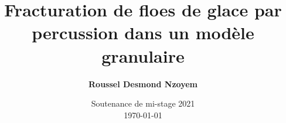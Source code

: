 \documentclass[notes,handout,compress]{beamer}
\begin{document}

\title[\textsc{Fracturation de floes de glace}]{\LARGE Fracturation de floes de glace par percussion dans un modèle granulaire}

\author[Roussel Desmond Nzoyem]{\large \bfseries Roussel Desmond Nzoyem}



\date[Soutenance mi-stage 2021]{Soutenance de mi-stage 2021\\\today}


\begingroup



  \begin{frame}[fragile]
    \vspace*{0.5cm}
    \maketitle
  \end{frame}
\endgroup


\end{document}
